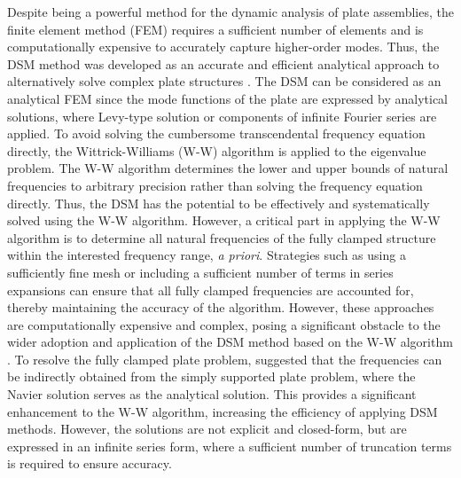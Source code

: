 \documentclass[preprint,12pt]{elsarticle}
\begin{document}
Despite being a powerful method for the dynamic analysis of plate assemblies, the finite element method (FEM) requires a sufficient number of elements and is computationally expensive to accurately capture higher-order modes.
Thus, the DSM method was developed as an accurate and efficient analytical approach to alternatively solve complex plate structures \cite{boscolo2011dynamic,fazzolari2013exact}. 
The DSM can be considered as an analytical FEM since the mode functions of the plate are expressed by analytical solutions, where Levy-type solution \cite{ghorbel2015dynamic} or components of infinite Fourier series \cite{banerjee2015dynamic,liu2016free} are applied.
To avoid solving the cumbersome transcendental frequency equation directly, the Wittrick-Williams (W-W) algorithm \cite{wittrick1971general} is applied to the eigenvalue problem.
The W-W algorithm determines the lower and upper bounds of natural frequencies to arbitrary precision rather than solving the frequency equation directly. 
Thus, the DSM has the potential to be effectively and systematically solved using the W-W algorithm.
However, a critical part in applying the W-W algorithm is to determine all natural frequencies of the fully clamped structure within the interested frequency range, \textit{a priori}.
Strategies such as using a sufficiently fine mesh or including a sufficient number of terms in series expansions \cite{banerjee2015dynamic} can ensure that all fully clamped frequencies are accounted for, thereby maintaining the accuracy of the algorithm. 
However, these approaches are computationally expensive and complex, posing a significant obstacle to the wider adoption and application of the DSM method based on the W-W algorithm \cite{han2018improved}.
To resolve the fully clamped plate problem, \citet{liu2015exact} suggested that the frequencies can be indirectly obtained from the simply supported plate problem, where the Navier solution serves as the analytical solution. 
This provides a significant enhancement to the W-W algorithm, increasing the efficiency of applying DSM methods. 
However, the solutions are not explicit and closed-form, but are expressed in an infinite series form, where a sufficient number of truncation terms is required to ensure accuracy.
\end{document}
